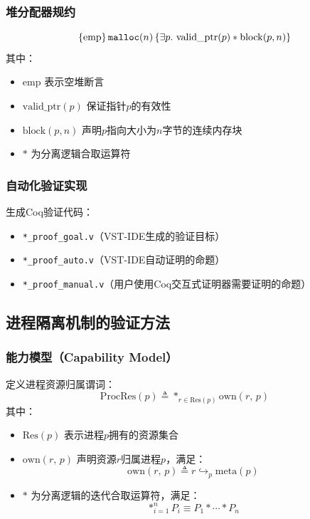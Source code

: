 \subsubsection{堆分配器规约}
\begin{equation}
\{\mathrm{emp}\}\,\mathtt{malloc}(n)\,\{\exists p.\ \mathrm{valid\_ptr}(p) \ast \mathrm{block}(p, n)\}
\end{equation}
\noindent 其中：
\begin{itemize}
    \item $\mathrm{emp}$ 表示空堆断言
    \item $\mathrm{valid\_ptr}(p)$ 保证指针$p$的有效性
    \item $\mathrm{block}(p, n)$ 声明$p$指向大小为$n$字节的连续内存块
    \item $\ast$ 为分离逻辑合取运算符
\end{itemize}

\subsubsection{自动化验证实现}
生成Coq验证代码：
\begin{itemize}
    \item \texttt{*\_proof\_goal.v}（VST-IDE生成的验证目标）
    \item \texttt{*\_proof\_auto.v}（VST-IDE自动证明的命题）
    \item \texttt{*\_proof\_manual.v}（用户使用Coq交互式证明器需要证明的命题）
\end{itemize}

\subsection{进程隔离机制的验证方法}
\label{subsec:proc-isolation}

\subsubsection{能力模型（Capability Model）}
\label{subsubsec:capability-model}

\noindent 定义进程资源归属谓词：
\begin{equation}
\mathrm{ProcRes}(p) \triangleq \ast_{r \in \mathrm{Res}(p)} \mathrm{own}(r,\,p)
\end{equation}
\noindent 其中：
\begin{itemize}
    \item $\mathrm{Res}(p)$ 表示进程$p$拥有的资源集合
    \item $\mathrm{own}(r,\,p)$ 声明资源$r$归属进程$p$，满足：
        \begin{equation}
        \mathrm{own}(r,\,p) \triangleq r \hookrightarrow_p \mathrm{meta}(p)
        \end{equation}
    \item $\ast$ 为分离逻辑的迭代合取运算符，满足：
        \begin{equation}
        \ast_{i=1}^n P_i \equiv P_1 \ast \cdots \ast P_n
        \end{equation}
\end{itemize}

